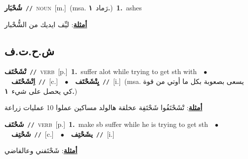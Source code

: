 \documentclass[10pt,a4paper,twoside]{article} %
\begin{document}
\begin{multicols}{2}
{\setlength\topsep{0pt}\textbf{\foreignlanguage{arabic}{شُحْبَار}}\ {\color{gray}\texttt{//}\color{black}}\ \textsc{noun}\ [m.]\ \color{gray}(msa. \foreignlanguage{arabic}{رَماد}~\foreignlanguage{arabic}{\textbf{١.}})\color{black}\ \textbf{1.}~ashes\  \begin{flushright}\color{gray}\foreignlanguage{arabic}{\textbf{\underline{\foreignlanguage{arabic}{أمثلة}}}: ليِّف ايديك من الشُّحْبار}\end{flushright}\color{black}} \vspace{2mm}

\vspace{-3mm}
\subsection*{\color{blue}\foreignlanguage{arabic}{ش.ح.ت.ف}\color{blue}{}} 

{\setlength\topsep{0pt}\textbf{\foreignlanguage{arabic}{تْشَحْتَف}}\ {\color{gray}\texttt{//}\color{black}}\ \textsc{verb}\ [p.]\ \textbf{1.}~suffer alot while trying to get sth with\ \ $\bullet$\ \ \setlength\topsep{0pt}\textbf{\foreignlanguage{arabic}{اِتْشَحْتَف}}\ {\color{gray}\texttt{//}\color{black}}\ [c.]\ \ $\bullet$\ \ \setlength\topsep{0pt}\textbf{\foreignlanguage{arabic}{يِتْشَحْتَف}}\ {\color{gray}\texttt{//}\color{black}}\ [i.]\ \color{gray}(msa. \foreignlanguage{arabic}{يسعى بصعوبة بكل ما أوتي من قوة كي يحصل على شيء}~\foreignlanguage{arabic}{\textbf{١.}})\color{black}\  \begin{flushright}\color{gray}\foreignlanguage{arabic}{\textbf{\underline{\foreignlanguage{arabic}{أمثلة}}}: تْشَحْتَفُوا شَحْتَفِة عخلقة هالولد مساكين عملوا 10 عمليات زراعة}\end{flushright}\color{black}} \vspace{2mm}

{\setlength\topsep{0pt}\textbf{\foreignlanguage{arabic}{شَحْتَف}}\ {\color{gray}\texttt{//}\color{black}}\ \textsc{verb}\ [p.]\ \textbf{1.}~make sb suffer while he is trying to get sth\ \ $\bullet$\ \ \setlength\topsep{0pt}\textbf{\foreignlanguage{arabic}{شَحْتِف}}\ {\color{gray}\texttt{//}\color{black}}\ [c.]\ \ $\bullet$\ \ \setlength\topsep{0pt}\textbf{\foreignlanguage{arabic}{يشَحْتِف}}\ {\color{gray}\texttt{//}\color{black}}\ [i.]\  \begin{flushright}\color{gray}\foreignlanguage{arabic}{\textbf{\underline{\foreignlanguage{arabic}{أمثلة}}}: شَحْتَفني وعالفاضي}\end{flushright}\color{black}} \vspace{2mm}


\end{multicols}
\end{document}
